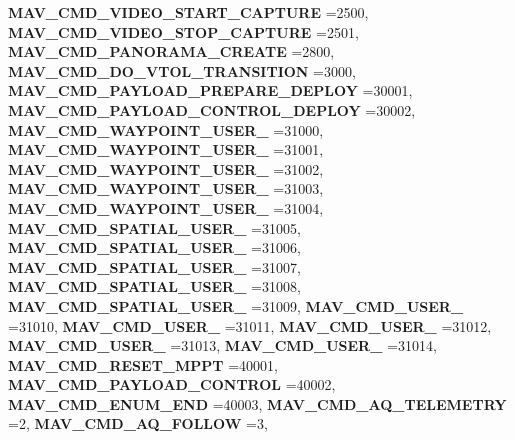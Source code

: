 \begin{DoxyCompactItemize}
\textbf{ M\+A\+V\+\_\+\+C\+M\+D\+\_\+\+V\+I\+D\+E\+O\+\_\+\+S\+T\+A\+R\+T\+\_\+\+C\+A\+P\+T\+U\+RE} =2500, 
\textbf{ M\+A\+V\+\_\+\+C\+M\+D\+\_\+\+V\+I\+D\+E\+O\+\_\+\+S\+T\+O\+P\+\_\+\+C\+A\+P\+T\+U\+RE} =2501, 
\textbf{ M\+A\+V\+\_\+\+C\+M\+D\+\_\+\+P\+A\+N\+O\+R\+A\+M\+A\+\_\+\+C\+R\+E\+A\+TE} =2800, 
\newline
\textbf{ M\+A\+V\+\_\+\+C\+M\+D\+\_\+\+D\+O\+\_\+\+V\+T\+O\+L\+\_\+\+T\+R\+A\+N\+S\+I\+T\+I\+ON} =3000, 
\textbf{ M\+A\+V\+\_\+\+C\+M\+D\+\_\+\+P\+A\+Y\+L\+O\+A\+D\+\_\+\+P\+R\+E\+P\+A\+R\+E\+\_\+\+D\+E\+P\+L\+OY} =30001, 
\textbf{ M\+A\+V\+\_\+\+C\+M\+D\+\_\+\+P\+A\+Y\+L\+O\+A\+D\+\_\+\+C\+O\+N\+T\+R\+O\+L\+\_\+\+D\+E\+P\+L\+OY} =30002, 
\textbf{ M\+A\+V\+\_\+\+C\+M\+D\+\_\+\+W\+A\+Y\+P\+O\+I\+N\+T\+\_\+\+U\+S\+E\+R\+\_} =31000, 
\newline
\textbf{ M\+A\+V\+\_\+\+C\+M\+D\+\_\+\+W\+A\+Y\+P\+O\+I\+N\+T\+\_\+\+U\+S\+E\+R\+\_} =31001, 
\textbf{ M\+A\+V\+\_\+\+C\+M\+D\+\_\+\+W\+A\+Y\+P\+O\+I\+N\+T\+\_\+\+U\+S\+E\+R\+\_} =31002, 
\textbf{ M\+A\+V\+\_\+\+C\+M\+D\+\_\+\+W\+A\+Y\+P\+O\+I\+N\+T\+\_\+\+U\+S\+E\+R\+\_} =31003, 
\textbf{ M\+A\+V\+\_\+\+C\+M\+D\+\_\+\+W\+A\+Y\+P\+O\+I\+N\+T\+\_\+\+U\+S\+E\+R\+\_} =31004, 
\newline
\textbf{ M\+A\+V\+\_\+\+C\+M\+D\+\_\+\+S\+P\+A\+T\+I\+A\+L\+\_\+\+U\+S\+E\+R\+\_} =31005, 
\textbf{ M\+A\+V\+\_\+\+C\+M\+D\+\_\+\+S\+P\+A\+T\+I\+A\+L\+\_\+\+U\+S\+E\+R\+\_} =31006, 
\textbf{ M\+A\+V\+\_\+\+C\+M\+D\+\_\+\+S\+P\+A\+T\+I\+A\+L\+\_\+\+U\+S\+E\+R\+\_} =31007, 
\textbf{ M\+A\+V\+\_\+\+C\+M\+D\+\_\+\+S\+P\+A\+T\+I\+A\+L\+\_\+\+U\+S\+E\+R\+\_} =31008, 
\newline
\textbf{ M\+A\+V\+\_\+\+C\+M\+D\+\_\+\+S\+P\+A\+T\+I\+A\+L\+\_\+\+U\+S\+E\+R\+\_} =31009, 
\textbf{ M\+A\+V\+\_\+\+C\+M\+D\+\_\+\+U\+S\+E\+R\+\_} =31010, 
\textbf{ M\+A\+V\+\_\+\+C\+M\+D\+\_\+\+U\+S\+E\+R\+\_} =31011, 
\textbf{ M\+A\+V\+\_\+\+C\+M\+D\+\_\+\+U\+S\+E\+R\+\_} =31012, 
\newline
\textbf{ M\+A\+V\+\_\+\+C\+M\+D\+\_\+\+U\+S\+E\+R\+\_} =31013, 
\textbf{ M\+A\+V\+\_\+\+C\+M\+D\+\_\+\+U\+S\+E\+R\+\_} =31014, 
\textbf{ M\+A\+V\+\_\+\+C\+M\+D\+\_\+\+R\+E\+S\+E\+T\+\_\+\+M\+P\+PT} =40001, 
\textbf{ M\+A\+V\+\_\+\+C\+M\+D\+\_\+\+P\+A\+Y\+L\+O\+A\+D\+\_\+\+C\+O\+N\+T\+R\+OL} =40002, 
\newline
\textbf{ M\+A\+V\+\_\+\+C\+M\+D\+\_\+\+E\+N\+U\+M\+\_\+\+E\+ND} =40003, 
\textbf{ M\+A\+V\+\_\+\+C\+M\+D\+\_\+\+A\+Q\+\_\+\+T\+E\+L\+E\+M\+E\+T\+RY} =2, 
\textbf{ M\+A\+V\+\_\+\+C\+M\+D\+\_\+\+A\+Q\+\_\+\+F\+O\+L\+L\+OW} =3, 

\end{DoxyCompactItemize}
